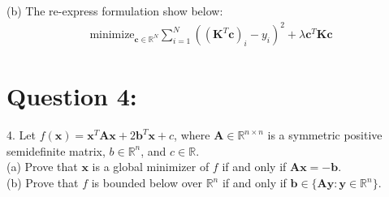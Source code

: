 \documentclass[a4paper,12pt]{article}
\newcommand{\R}{\mathbb{R}}
\begin{document}
(b) 
The re-express formulation show below:
\begin{align*}
    \text{minimize}_{\bm{c} \in \R^N} \sum_{i = 1}^N ((\bm{K}^T\bm{c})_i - y_i)^2 + \lambda \bm{c}^T \bm{K} \bm{c}
\end{align*}


\section*{Question 4:}
4. Let \(f(\bm{x}) = \bm{x}^T\bm{A}\bm{x} + 2\bm{b}^T\bm{x} + c\), where \(\bm{A} \in \R^{n \times n}\) is a symmetric positive semidefinite matrix, \(b \in \R^n\), and \(c \in \R\). \\
(a) Prove that \(\bm{x}\) is a global minimizer of \(f\) if and only if \(\bm{A}\bm{x} = -\bm{b}\). \\
(b) Prove that \(f\) is bounded below over \(\R^n\) if and only if \(\bm{b} \in \{\bm{A}\bm{y}: \bm{y} \in \R^n\}\). \\
\end{document}
